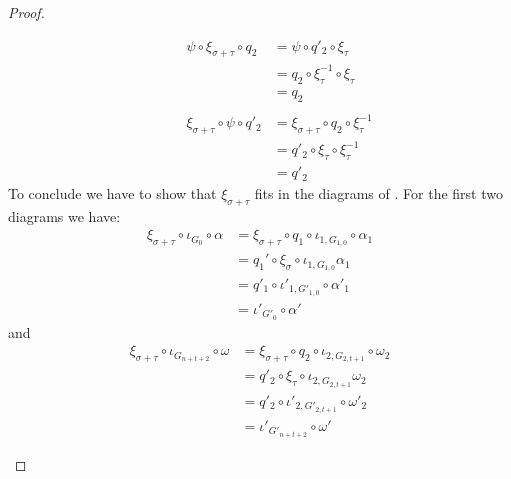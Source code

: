 \documentclass[a4paper]{article}
\theoremstyle{definition}
\begin{document}
\begin{proof}
\begin{itemize}
\[\begin{split}
\end{split}\qquad \begin{split}
	\psi \circ \xi_{\sigma+\tau}\circ  q_2&=\psi \circ q'_2\circ \xi_\tau \\&=q_2\circ \xi^{-1}_{\tau}\circ \xi_\tau\\&=q_2\\ \\ 	\xi_{\sigma+\tau}\circ \psi \circ q'_2&=\xi_{\sigma+\tau}\circ q_2\circ \xi^{-1}_\tau \\&=q'_2\circ \xi_{\tau}\circ \xi^{-1}_\tau\\&=q'_2
\end{split}\]
To conclude we have to show that $\xi_{\sigma+\tau}$ fits in the diagrams of . For the first two diagrams we have:
\begin{align*}
	\xi_{\sigma+\tau} \circ \iota_{G_{0}}\circ \alpha&=\xi_{\sigma+\tau} \circ q_1 \circ \iota_{1,G_{1,0}}\circ \alpha_1\\&=q_1'\circ \xi_\sigma \circ  \iota_{1,G_{1,0}} \alpha_1\\&=q'_1\circ \iota'_{1, G'_{1,0}}\circ \alpha'_1\\&=\iota'_{G'_0}\circ \alpha'
\end{align*} 
and
\begin{align*}
	\xi_{\sigma+\tau} \circ \iota_{G_{n+t+2}}\circ \omega&=\xi_{\sigma+\tau} \circ q_2 \circ \iota_{2,G_{2,t+1}}\circ \omega_2\\&=q'_2\circ \xi_\tau \circ  \iota_{2,G_{2,t+1}} \omega_2\\&=q'_2\circ \iota'_{2, G'_{2,t+1}}\circ \omega'_2\\&=\iota'_{G'_{n+t+2}}\circ \omega'
\end{align*}  


\end{itemize}
\end{proof}
\end{document}
